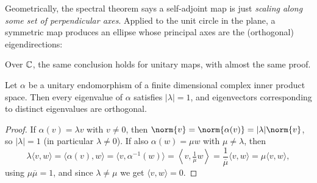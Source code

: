 \documentclass[a4paper]{scrartcl}
\begin{document}
Geometrically, the spectral theorem says a self-adjoint map is just \emph{scaling along some set of perpendicular axes}. Applied to the unit circle in the plane, a symmetric map produces an ellipse whose principal axes are the (orthogonal) eigendirections:
\begin{center}
\end{center}

Over $\mathbb{C}$, the same conclusion holds for unitary maps, with almost the same proof.

\begin{lemma}
    Let $\alpha$ be a unitary endomorphism of a finite dimensional complex inner product space. Then every eigenvalue of $\alpha$ satisfies $|\lambda| = 1$, and eigenvectors corresponding to distinct eigenvalues are orthogonal.
\end{lemma}
\begin{proof}
    If $\alpha(v) = \lambda v$ with $v \neq 0$, then $\norm{v} = \norm{\alpha(v)} = |\lambda|\norm{v}$, so $|\lambda| = 1$ (in particular $\lambda \neq 0$). If also $\alpha(w) = \mu w$ with $\mu \neq \lambda$, then
    $$
    \lambda\langle v, w \rangle = \langle \alpha(v), w \rangle = \langle v, \alpha^{-1}(w)\rangle = \left\langle v, \tfrac{1}{\mu}w\right\rangle = \frac{1}{\overline{\mu}}\langle v, w\rangle = \mu \langle v, w \rangle,
    $$
    using $\mu\overline{\mu} = 1$, and since $\lambda \neq \mu$ we get $\langle v, w \rangle = 0$.
\end{proof}
\end{document}

